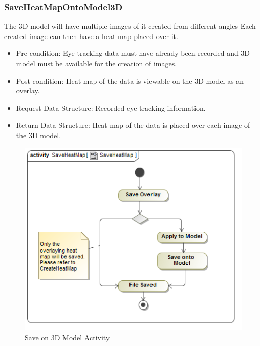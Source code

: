 	\subsubsection{SaveHeatMapOntoModel3D}
	The 3D model will have multiple images of it created from different angles Each created image can then have a heat-map placed over it.
	\begin{itemize}
		\item Pre-condition: Eye tracking data must have already been recorded and 3D model must be available for the creation of images.
		\item Post-condition: Heat-map of the data is viewable on the 3D model as an overlay.
		\item Request Data Structure: Recorded eye tracking information.
		\item Return Data Structure: Heat-map of the data is placed over each image of the 3D model.
	\end{itemize}
	\begin{figure}[!ht]
		\centering	
		\includegraphics[scale=0.5]{Diagrams/Activity_Diagram__SaveHeatMap__SaveHeatMap.png}	
		\caption{Save on 3D Model Activity}
	\end{figure}
	
	
